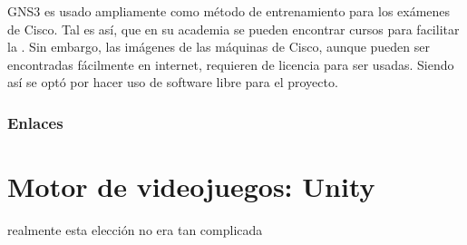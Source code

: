 GNS3 es usado ampliamente como método de entrenamiento para los exámenes de Cisco. Tal es así, que en su academia se pueden encontrar cursos para facilitar la . Sin embargo, las imágenes de las máquinas de Cisco, aunque pueden ser encontradas fácilmente en internet, requieren de licencia para ser usadas. Siendo así se optó por hacer uso de software libre para el proyecto.

\subsubsection{Enlaces}

\section{Motor de videojuegos: Unity}
realmente esta elección no era tan complicada
